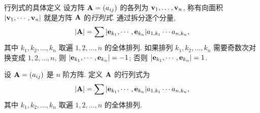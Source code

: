 

\begin{frame}{行列式的具体定义\noexer}
	\onslide<+->
	设方阵 ${\mathbf{A}}=(a_{ij})$ 的各列为 ${\mathbf{v}}_1,\dots,{\mathbf{v}}_n$,
	\onslide<+->
	称有向面积 $|{\mathbf{v}}_1,\cdots,{\mathbf{v}}_n|$ 就是方阵 ${\mathbf{A}}$ 的\emph{行列式}.
	\onslide<+->
	通过拆分逐个分量,
	\[|{\mathbf{A}}|=\sum |{\mathbf{e}}_{k_1},\cdots,{\mathbf{e}}_{k_n}| a_{1,k_1}\cdots a_{n,k_n}, \]
	其中 $k_1,k_2,\dots,k_n$ 取遍 $1,2,\dots,n$ 的全体排列.
	\onslide<+->
	如果排列 $k_1,k_2,\dots,k_n$ 需要奇数次对换变成 $1,2,\dots,n$, 则 
	$|{\mathbf{e}}_{k_1},\cdots,{\mathbf{e}}_{k_n}|=-1$; 否则 $|{\mathbf{e}}_{k_1},\cdots,{\mathbf{e}}_{k_n}|=1$.
	\onslide<+->
	\begin{definition}
		设 ${\mathbf{A}}=(a_{ij})$ 是 $n$ 阶方阵.
		定义 ${\mathbf{A}}$ 的行列式为
		\[|{\mathbf{A}}|=\sum |{\mathbf{e}}_{k_1},\cdots,{\mathbf{e}}_{k_n}| a_{1,k_1}\cdots a_{n,k_n},\]
		其中 $k_1,k_2,\dots,k_n$ 取遍 $1,2,\dots,n$ 的全体排列.
	\end{definition}
\end{frame}


